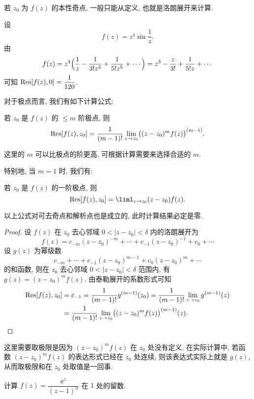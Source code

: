 若 $z_0$ 为 $f(z)$ 的本性奇点, 一般只能从定义, 也就是洛朗展开来计算.

\begin{example}
  设
  \[
    f(z)=z^4\sin\dfrac1z.
  \]
  由
  \[
     f(z)
    =z^4\Bigl(\frac1z-\frac1{3!z^3}+\frac1{5!z^5}+\cdots\Bigr)
    =z^3-\frac z{3!}+\frac1{5!z}+\cdots
  \]
  可知 ${\mathrm{Res}}[f(z),0]=\dfrac1{120}$.
\end{example}

对于极点而言, 我们有如下计算公式:

\begin{theorem}[留数计算公式 I]
  \label{thm:residue-formula-for-pole}
  若 $z_0$ 是 $f(z)$ 的 $\le m$ 阶极点, 则
  \[
    {\mathrm{Res}}[f(z),z_0]=\frac1{(m-1)!}\lim_{z\rightarrow z_0}\bigl((z-z_0)^mf(z)\bigr)^{(m-1)}.
  \]
\end{theorem}

这里的 $m$ 可以比极点的阶更高, 可根据计算需要来选择合适的 $m$.

特别地, 当 $m=1$ 时, 我们有:
\begin{theorem}[留数计算公式 II]
  若 $z_0$ 是 $f(z)$ 的一阶极点, 则
  \[
    \Res[f(z),z_0]=\liml_{z\ra z_0}(z-z_0)f(z).
  \]
\end{theorem}
以上公式对可去奇点和解析点也是成立的, 此时计算结果必定是零.

\begin{proof}
  设 $f(z)$ 在 $z_0$ 去心邻域 $0<|z-z_0|<\delta$ 内的洛朗展开为
  \[
    f(z)=c_{-m}(z-z_0)^{-m}+\cdots+c_{-1}(z-z_0)^{-1}+c_0+\cdots
  \]
  设 $g(z)$ 为幂级数
  \[
    c_{-m}+\cdots+c_{-1}(z-z_0)^{m-1}+c_0(z-z_0)^m+\cdots
  \]
  的和函数, 则在 $z_0$ 去心邻域 $0<|z-z_0|<\delta$ 范围内, 有 $g(z)=(z-z_0)^mf(z)$.
  由泰勒展开的系数形式可知
  \begin{align*}
     {\mathrm{Res}}[f(z),z_0]&
    =c_{-1}
    =\dfrac1{(m-1)!}g^{(m-1)}(z_0)
    =\dfrac1{(m-1)!}\lim_{z\rightarrow z_0}g^{(m-1)}(z)\\&
    =\dfrac1{(m-1)!}\lim_{z\rightarrow z_0}\bigl((z-z_0)^mf(z)\bigr)^{(m-1)}(z).\qedhere
  \end{align*}
\end{proof}

这里需要取极限是因为 $(z-z_0)^mf(z)$ 在 $z_0$ 处没有定义.
在实际计算中, 若函数 $(z-z_0)^mf(z)$ 的表达形式已经在 $z_0$ 处连续, 则该表达式实际上就是 $g(z)$, 从而取极限和在 $z_0$ 处取值是一回事.

\begin{example}
  计算 $f(z)=\dfrac{\ee^z}{(z-1)^n}$ 在 $1$ 处的留数.
\end{example}

